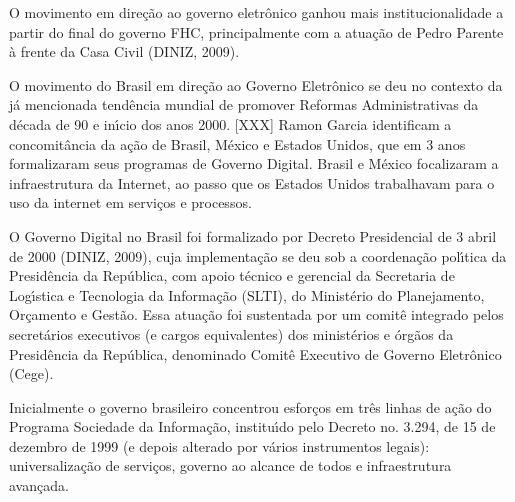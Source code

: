 \documentclass[
12pt,		%
openright,	%
twoside,  %
a4paper,			%
chapter=TITLE,		%
english,			%
french,				%
spanish,			%
brazil				%
]{USPSC-classe/USPSC}
\begin{document}
O movimento em dire\c{c}\~ao ao governo eletr\^onico ganhou mais institucionalidade a partir do final do governo FHC, principalmente com a atua\c{c}\~ao de Pedro Parente \`a frente da Casa Civil  (DINIZ, 2009).

















O movimento do Brasil em dire\c{c}\~ao ao Governo Eletr\^onico se deu no contexto da j\'a mencionada tend\^encia mundial de promover Reformas Administrativas da d\'ecada de 90 e in\'{\i}cio dos anos 2000. [XXX] Ramon Garcia identificam a concomit\^ancia da a\c{c}\~ao de Brasil, M\'exico e Estados Unidos, que em 3 anos formalizaram seus programas de Governo Digital. Brasil e M\'exico focalizaram a infraestrutura da Internet, ao passo que os Estados Unidos trabalhavam para o uso da internet em servi\c{c}os e processos.

















O Governo Digital no Brasil foi formalizado por Decreto Presidencial de 3 abril de 2000  (DINIZ, 2009), cuja implementa\c{c}\~ao se deu sob a coordena\c{c}\~ao pol\'{\i}tica da Presid\^encia da Rep\'ublica, com apoio t\'ecnico e gerencial da Secretaria de Log\'{\i}stica e Tecnologia da Informa\c{c}\~ao (SLTI), do Minist\'erio do Planejamento, Or\c{c}amento e Gest\~ao. Essa atua\c{c}\~ao foi sustentada por um comit\^e integrado pelos secret\'arios executivos (e cargos equivalentes) dos minist\'erios e \'org\~aos da Presid\^encia da Rep\'ublica, denominado Comit\^e Executivo de Governo Eletr\^onico (Cege).

















Inicialmente o governo brasileiro concentrou esfor\c{c}os em tr\^es linhas de a\c{c}\~ao do Programa Sociedade da Informa\c{c}\~ao, institu\'{\i}do pelo Decreto no. 3.294, de 15 de dezembro de 1999 (e depois alterado por v\'arios instrumentos legais): universaliza\c{c}\~ao de servi\c{c}os, governo ao alcance de todos e infraestrutura avan\c{c}ada.
\end{document}
